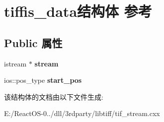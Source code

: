 \hypertarget{structtiffis__data}{}\section{tiffis\+\_\+data结构体 参考}
\label{structtiffis__data}
\subsection*{Public 属性}
\begin{DoxyCompactItemize}
\item 
\mbox{\label{structtiffis__data_ae5e9585a92a3c80408ea5ed84c4430ec}} 
istream $\ast$ {\bfseries stream}
\item 
\mbox{\label{structtiffis__data_a6b87d7f42d825053dffb37c7e70ebda3}} 
ios\+::pos\+\_\+type {\bfseries start\+\_\+pos}
\end{DoxyCompactItemize}


该结构体的文档由以下文件生成\+:\begin{DoxyCompactItemize}
\item 
E\+:/\+React\+O\+S-\/0../dll/3rdparty/libtiff/tif\+\_\+stream.\+cxx\end{DoxyCompactItemize}
